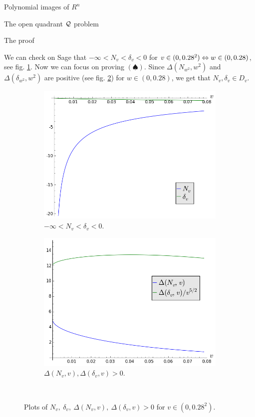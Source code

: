 \documentclass[11pt, a4paper, english, twoside, notitlepage]{report}
\begin{document}
\begin{chapter}{Polynomial images of $R^n$}
\begin{section}{The open quadrant $\mathcal{Q}$ problem}
\begin{subsection}{The proof}
\begin{Proof}
			We can check on Sage that $-\infty<N_v<\delta_v<0$ for $v \in (0, 0.28^2) \Leftrightarrow w \in (0, 0.28)$, see fig. \ref{fig:comp}. Now we can focus on proving $(\spadesuit)$. Since $\Delta(N_{w^2}, w^2)$ and $\Delta(\delta_{w^2}, w^2)$ are positive (see fig. \ref{fig:positive}) for $w \in (0, 0.28)$, we get that $N_v, \delta_v\in D_v$.
		\begin{figure}[h]\hspace{-1cm}
			\begin{subfigure}{.56\linewidth}\centering
				\includegraphics[width=1\textwidth]{plots/ch1_13_comp.png}
				\caption{$-\infty<N_v<\delta_v<0$.\label{fig:comp}}
			\end{subfigure}
			\begin{subfigure}{.6\linewidth}\centering
				\includegraphics[width=1\textwidth]{plots/ch1_14_positive.png}
				\caption{$\Delta(N_{v}, v), \Delta(\delta_{v},v) > 0$.\label{fig:positive}}
			\end{subfigure}\\[1ex]
			\caption{Plots of $N_v,\ \delta_v,\ \Delta(N_{v}, v),\ \Delta(\delta_{v},v) > 0$ for $v \in (0, 0.28^2)$.\label{fig:N_delta}}
		\end{figure}


\end{Proof}
\end{subsection}
\end{section}
\end{chapter}
\end{document}
